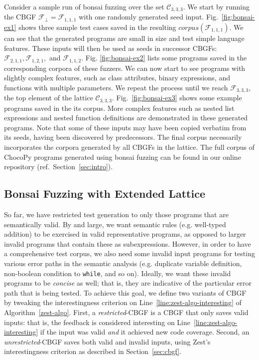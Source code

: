 \documentclass[conference]{IEEEtran}
\newcommand{\code}{\texttt}
\newcommand{\tech}{bonsai fuzzing} \newcommand{\Tech}{Bonsai fuzzing} \newcommand{\TECH}{Bonsai Fuzzing}
\begin{document}
Consider a sample run of \tech{} over the set $\mathcal{C}_{3,3,3}$. We start by running the CBGF $\mathcal{F}_{\bot} = \mathcal{F}_{1,1,1}$ with one randomly generated seed input. Fig.~\ref{fig:bonsai-ex1} shows three sample test cases saved in the resulting $\mathit{corpus}(\mathcal{F}_{1,1,1})$. We can see that the generated programs are small in size and test simple language features. These inputs will then be used as seeds in successor CBGFs: $\mathcal{F}_{2,1,1}, \mathcal{F}_{1,2,1},$ and $\mathcal{F}_{1,1,2}$. Fig. \ref{fig:bonsai-ex2} lists some programs saved in the corresponding corpora of these fuzzers. We can now start to see programs with slightly complex features, such as class attributes, binary expressions, and functions with multiple parameters. We repeat the process until we reach $\mathcal{F}_{3,3,3}$, the top element of the lattice $\mathcal{C}_{3,3,3}$. 
Fig.~\ref{fig:bonsai-ex3} shows some example programs saved in the its corpus. More complex features such as nested list expressions and nested function definitions are demonstrated in these generated programs. Note that some of these inputs may have been copied verbatim from its seeds, having been discovered by predecessors. The final corpus necessarily incorporates the corpora generated by all CBGFs in the lattice. The full corpus of ChocoPy programs generated using \tech{} can be found in our online repository (ref.~Section~\ref{sec:intro}).


\subsection{\TECH{} with Extended Lattice}
\label{sec:restricted}

So far, we have restricted test generation to only those programs that are semantically valid. By and large, we want semantic rules (e.g. well-typed addition) to be exercised in valid representative programs, as opposed to larger invalid programs that contain these as subexpressions. However, in order to have a comprehensive test corpus, we also need some invalid input programs for testing various error paths in the semantic analysis (e.g. duplicate variable definition, non-boolean condition to \code{while}, and so on). Ideally, we want these invalid programs to be \textit{concise} as well; that is, they are indicative of the particular error path that is being tested. To achieve this goal, we define two variants of CBGF by tweaking the interestingness criterion on  Line~\ref{line:zest-algo-interesting} of Algorithm~\ref{zest-algo}. First, a \emph{restricted}-CBGF is a CBGF that only saves valid inputs: that is, the feedback is considered interesting on Line~\ref{line:zest-algo-interesting} if the input was valid \emph{and} it achieved new code coverage. Second, an \emph{unrestricted}-CBGF saves both valid and invalid inputs, using Zest's interestingness criterion as described in Section~\ref{sec:cbgf}.
\end{document}
